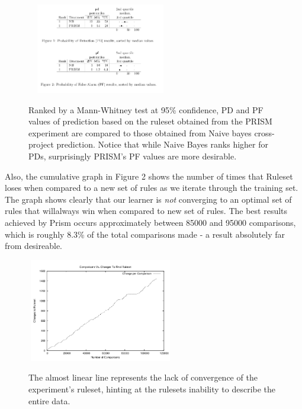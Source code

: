 \documentclass{sig-alternate}
\begin{document}
\begin{figure}
\includegraphics[width=243, height=149]{pd.png}
\label{fig:pds}
\caption{Ranked by a Mann-Whitney test at 95\% confidence, PD and PF values of prediction based on the ruleset obtained from the PRISM experiment are compared 
to those obtained from Naive bayes cross-project prediction. Notice that while Naive Bayes ranks higher for PDs, surprisingly PRISM's PF values are more desirable.}
\end{figure}

Also, the cumulative graph in Figure 2 shows the number of times that Ruleset loses when compared to a new set of rules as we iterate through the training set. The graph shows clearly that our learner is {\em not} converging to an optimal set of rules that willalways win when compared to new set of rules. The best results achieved by Prism occurs approximately between 85000 and 95000 comparisons, which is roughly 8.3\% of the total comparisons made - a result absolutely far from desireable.

\begin{figure}
\includegraphics[width=243, height=170]{iter.png}
\label{fig:iters}
\caption{The almost linear line represents the lack of convergence of the experiment's ruleset, hinting at the rulesets inability to describe the entire data. }
\end{figure}
\end{document}
